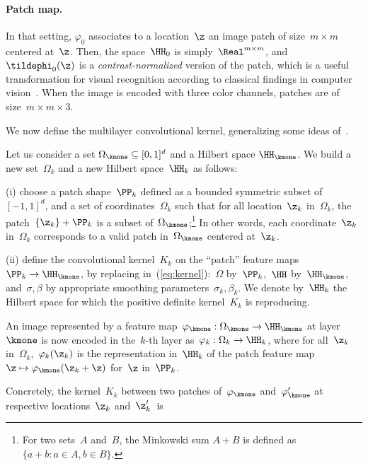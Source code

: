\vs
\paragraph{Patch map.} In that setting, $\varphi_0$ associates to a
location~$\z$ an image patch of size~$m \times m$ centered at~$\z$.
Then, the space~$\HH_0$ is simply~$\Real^{m \times m}$, and~$\tildephi_0(\z)$ is a \emph{contrast-normalized}
version of the patch, which is a useful transformation for visual recognition according
to classical findings in computer vision~\cite{jarrett2009}. When the
image is encoded with three color channels, patches are of size~$m \times m
\times 3$.

We now define the multilayer convolutional kernel,
generalizing some ideas of~\cite{bo2011}.

\begin{definition}\label{def:multiscattering}
   Let us consider a set $\Omega_{\kmone} \subseteq [0,1]^d$ and a Hilbert space $\HH_{\kmone}$.
   We build a new set~$\Omega_k$ and a new Hilbert space~$\HH_k$ as follows:

   (i) choose a patch shape~$\PP_k$ defined as a bounded symmetric subset
   of~$[-1,1]^d$, and a set of coordinates~$\Omega_k$
   such that for all location~$\z_k$ in~$\Omega_k$, the patch~$\{\z_k\} + \PP_k$ is a subset of~$\Omega_{\kmone}$;\footnote{For two sets~$A$
   and~$B$, the Minkowski sum $A+B$ is defined as $\{ a + b : a \in A, b \in B\}$.\label{foot:minkowski}}
   In other words, each coordinate~$\z_k$ in~$\Omega_k$ corresponds to a valid patch in~$\Omega_{\kmone}$ centered at~$\z_k$.

   (ii) define the convolutional kernel~$K_k$ on the ``patch'' feature maps~$\PP_k \to
   \HH_{\kmone}$, by replacing in~(\ref{eq:kernel}):~$\Omega$ by~$\PP_k$,~$\HH$
   by~$\HH_{\kmone}$, and~$\sigma,\beta$ by appropriate smoothing
   parameters~$\sigma_k,\beta_k$. We denote by~$\HH_k$ the Hilbert space for
   which the positive definite kernel~$K_k$ is reproducing.

   An image represented by a feature map~$\varphi_{\kmone}: \Omega_{\kmone} \to
   \HH_{\kmone}$ at layer~$\kmone$ is now encoded in the~$k$-th layer as~$\varphi_k:
   \Omega_k \to \HH_k$, where for all~$\z_k$ in~$\Omega_k$,~$\varphi_{k}(\z_k)$ is the representation
   in~$\HH_k$ of the patch feature map~$\z \mapsto \varphi_{\kmone}(\z_k + \z)$ for~$\z$ in~$\PP_k$.
\end{definition}
Concretely, the kernel~$K_k$ between two patches of~$\varphi_{\kmone}$ and~$\varphi'_{\kmone}$ at respective locations~$\z_k$ and~$\z_k'$~is
